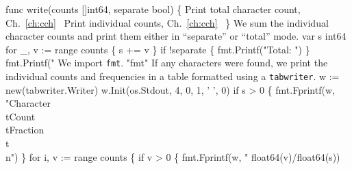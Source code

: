 func write(counts []int64, separate bool) \{
          \LA{}Print total character count, Ch.~\ref{ch:cch}~{\nwtagstyle{}}\RA{}
          \LA{}Print individual counts, Ch.~\ref{ch:cch}~{\nwtagstyle{}}\RA{}
\}
\nwendcode{}\nwdocspar
We sum the individual character counts and print them either in ``separate''
or ``total'' mode.
\nwenddocs{}\endmoddef\nwstartdeflinemarkup{}\nwenddeflinemarkup
var s int64
for \_, v := range counts \{
          s += v
\}
if !separate \{
          fmt.Printf("Total: ")
\}
fmt.Printf("%
\nwendcode{}\nwdocspar
We import \texttt{fmt}.
\nwenddocs{}\plusendmoddef\nwstartdeflinemarkup{}\nwenddeflinemarkup
"fmt"
\nwendcode{}\nwdocspar
If any characters were found, we print the individual counts and
frequencies in a table formatted using a \texttt{tabwriter}.
\nwenddocs{}\endmoddef\nwstartdeflinemarkup{}\nwenddeflinemarkup
w := new(tabwriter.Writer)
w.Init(os.Stdout, 4, 0, 1, ' ', 0)
if s > 0 \{
          fmt.Fprintf(w, "Character\\tCount\\tFraction\\t\\n")
\}
for i, v := range counts \{
          if v > 0 \{
                  fmt.Fprintf(w, "%
                          float64(v)/float64(s))
